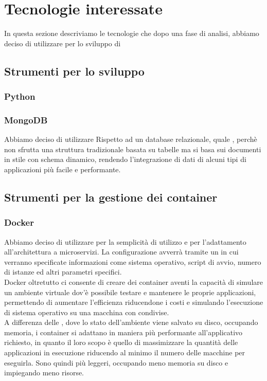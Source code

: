 \section{Tecnologie interessate}
In questa sezione descriviamo le tecnologie che dopo una fase di analisi, abbiamo deciso di utilizzare per lo sviluppo di \progetto
\subsection{Strumenti per lo sviluppo} %

\subsubsection{Python}

\subsubsection{MongoDB}
Abbiamo deciso di utilizzare  Rispetto ad un database relazionale, quale , perchè non sfrutta una struttura tradizionale basata su tabelle ma si basa sui documenti in stile  con schema dinamico, rendendo l’integrazione di dati di alcuni tipi di applicazioni più facile e performante.

\subsection{Strumenti per la gestione dei container}

\subsubsection{Docker}
Abbiamo deciso di utilizzare  per la semplicità di utilizzo e per l'adattamento all'architettura a microservizi.
La configurazione avverrà tramite un  in cui verranno specificate informazioni come sistema operativo, script di avvio,
numero di istanze ed altri parametri specifici. \\
Docker oltretutto ci consente di creare dei container aventi la capacità di simulare un ambiente virtuale dov'è possibile testare e mantenere le proprie applicazioni, permettendo di aumentare l'efficienza riducendone i costi e simulando l'esecuzione di sistema operativo su una macchina con  condivise.\\
A differenza delle , dove lo stato dell'ambiente viene salvato su disco, occupando memoria, i container si adattano in maniera più performante all'applicativo richiesto, in quanto il loro scopo è quello di massimizzare la quantità delle applicazioni in esecuzione riducendo al minimo il numero delle macchine per eseguirla.
Sono quindi più leggeri, occupando meno memoria su disco e impiegando meno risorse.


